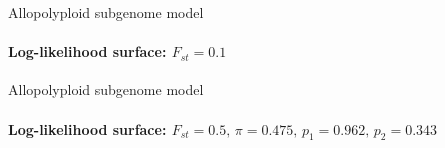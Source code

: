 \documentclass[presentation,sansserif]{beamer}
\begin{document}
{  %
\begin{frame}[c,plain]{Allopolyploid subgenome model}
	\framesubtitle{Log-likelihood surface: $F_{st}=0.1$}
	\begin{center}
	\end{center}
\end{frame}
}

{  %
\begin{frame}[c,plain]{Allopolyploid subgenome model}
	\framesubtitle{Log-likelihood surface: $F_{st}=0.5,\, \pi=0.475,\, p_1=0.962,\, p_2=0.343$}
	\begin{center}
	\end{center}
\end{frame}
}
\end{document}
